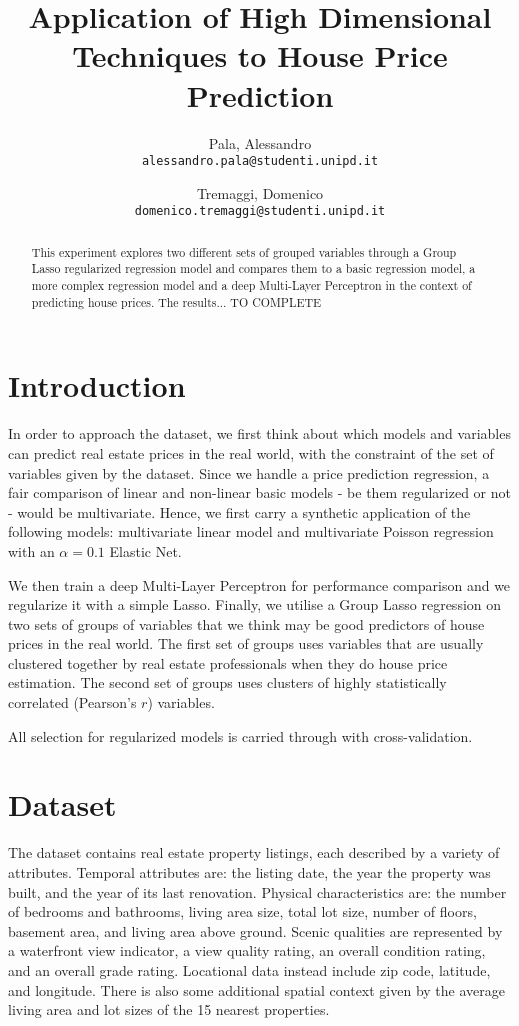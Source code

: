 \documentclass[a4paper, 8pt]{article}
\title{Application of High Dimensional Techniques to House Price Prediction}
\author{
  Pala, Alessandro\\
  \texttt{alessandro.pala@studenti.unipd.it}
  \and
  Tremaggi, Domenico\\
  \texttt{domenico.tremaggi@studenti.unipd.it}
}
\date{}
\begin{document}
\maketitle
\noindent
\begin{abstract}
This experiment explores two different sets of grouped variables through a Group Lasso regularized regression model and compares them to a basic regression model, a more complex regression model and a deep Multi-Layer Perceptron in the context of predicting house prices. The results... TO COMPLETE
\end{abstract}
\vspace{5pt}

\begin{multicols}{2}

\section{Introduction}
In order to approach the dataset, we first think about which models and variables can predict real estate prices in the real world, with the constraint of the set of variables given by the dataset. Since we handle a price prediction regression, a fair comparison of linear and non-linear basic models - be them regularized or not - would be multivariate. Hence, we first carry a synthetic application of the following models: multivariate linear model and multivariate Poisson regression with an $\alpha = 0.1$ Elastic Net.

We then train a deep Multi-Layer Perceptron for performance comparison and we regularize it with a simple Lasso.
Finally, we utilise a Group Lasso regression on two sets of groups of variables that we think may be good predictors of house prices in the real world. The first set of groups uses variables that are usually clustered together by real estate professionals when they do house price estimation. The second set of groups uses clusters of highly statistically correlated (Pearson's $r$) variables.

All selection for regularized models is carried through with cross-validation.

\section{Dataset}
The dataset contains real estate property listings, each described by a variety of attributes. Temporal attributes are: the listing date, the year the property was built, and the year of its last renovation. Physical characteristics are: the number of bedrooms and bathrooms, living area size, total lot size, number of floors, basement area, and living area above ground. Scenic qualities are represented by a waterfront view indicator, a view quality rating, an overall condition rating, and an overall grade rating. Locational data instead include zip code,  latitude, and longitude. There is also some additional spatial context given by the average living area and lot sizes of the 15 nearest properties.


\end{multicols}
\end{document}

